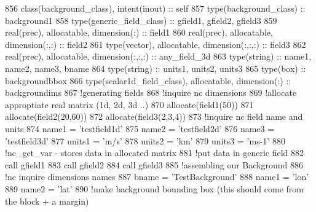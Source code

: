 \begin{DoxyCode}
856     \textcolor{keywordtype}{class}(background\_class), \textcolor{keywordtype}{intent(inout)} :: self
857     \textcolor{keywordtype}{type}(background\_class) :: background1
858     \textcolor{keywordtype}{type}(generic\_field\_class) :: gfield1, gfield2, gfield3
859     \textcolor{keywordtype}{real(prec)}, \textcolor{keywordtype}{allocatable}, \textcolor{keywordtype}{dimension(:)} :: field1
860     \textcolor{keywordtype}{real(prec)}, \textcolor{keywordtype}{allocatable}, \textcolor{keywordtype}{dimension(:,:)} :: field2
861     \textcolor{keywordtype}{type}(vector), \textcolor{keywordtype}{allocatable}, \textcolor{keywordtype}{dimension(:,:,:)} :: field3
862     \textcolor{keywordtype}{real(prec)}, \textcolor{keywordtype}{allocatable}, \textcolor{keywordtype}{dimension(:,:,:)} :: any\_field\_3d
863     \textcolor{keywordtype}{type}(string) :: name1, name2, name3, bname
864     \textcolor{keywordtype}{type}(string) :: units1, units2, units3
865     \textcolor{keywordtype}{type}(box) :: backgroundbbox
866     \textcolor{keywordtype}{type}(scalar1d\_field\_class), \textcolor{keywordtype}{allocatable}, \textcolor{keywordtype}{dimension(:)} :: backgroundims
867     \textcolor{comment}{!generating fields}
868     \textcolor{comment}{!inquire nc dimensions}
869     \textcolor{comment}{!allocate approptiate real matrix (1d, 2d, 3d ..)}
870     \textcolor{keyword}{allocate}(field1(50))
871     \textcolor{keyword}{allocate}(field2(20,60))
872     \textcolor{keyword}{allocate}(field3(2,3,4))
873     \textcolor{comment}{!inquire nc field name and units}
874     name1 = \textcolor{stringliteral}{'testfield1d'}
875     name2 = \textcolor{stringliteral}{'testfield2d'}
876     name3 = \textcolor{stringliteral}{'testfield3d'}
877     units1 = \textcolor{stringliteral}{'m/s'}
878     units2 = \textcolor{stringliteral}{'km'}
879     units3 = \textcolor{stringliteral}{'ms-1'}
880     \textcolor{comment}{!nc\_get\_var - stores data in allocated matrix}
881     \textcolor{comment}{!put data in generic field}
882     \textcolor{keyword}{call }gfield1%
883     \textcolor{keyword}{call }gfield2%
884     \textcolor{keyword}{call }gfield3%
885     \textcolor{comment}{!assembling our Background}
886     \textcolor{comment}{!nc inquire dimensions names}
887     bname = \textcolor{stringliteral}{'TestBackground'}
888     name1 = \textcolor{stringliteral}{'lon'}
889     name2 = \textcolor{stringliteral}{'lat'}
890     \textcolor{comment}{!make background bounding box (this should come from the block + a margin)}

\end{DoxyCode}
